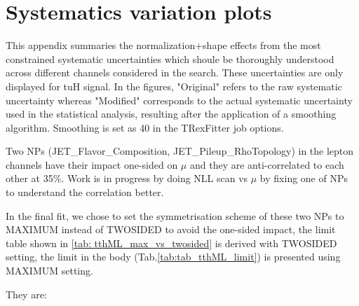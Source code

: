 \section{Systematics variation plots}
\label{sec:sys_variation}


This appendix summaries the normalization+shape effects from the most constrained systematic uncertainties which shoule be thoroughly understood across different channels considered in the search. These uncertainties are only displayed for tuH signal. In the figures, "Original" refers to the raw systematic uncertainty whereas "Modified" corresponds to the actual systematic uncertainty used in the statistical analysis, resulting after the application of a smoothing algorithm. Smoothing is set as 40 in the TRexFitter job options.

Two NPs (JET\_Flavor\_Composition, JET\_Pileup\_RhoTopology) in the lepton channels have their impact one-sided on $\mu$ and they are anti-correlated to each other
at 35\%. Work is in progress by doing NLL scan vs $\mu$ by fixing one of NPs to understand the correlation better.

In the final fit, we chose to set the symmetrisation scheme of these two NPs to MAXIMUM instead of TWOSIDED to avoid the one-sided impact, the limit table shown in \ref{tab: tthML_max_vs_twosided} is derived with TWOSIDED setting, the limit in the body (Tab.\ref{tab:tab_tthML_limit}) is presented using MAXIMUM setting.


They are:

